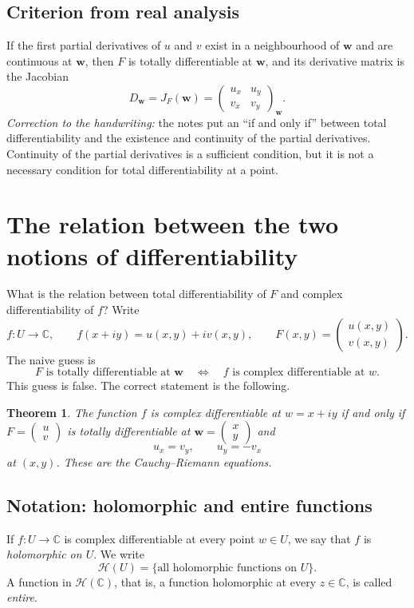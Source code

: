 \documentclass[11pt]{article}
\newcommand{\C}{\mathbb C}
\newcommand{\ww}{\mathbf w}
\newtheorem*{theorem}{Theorem}
\begin{document}
\subsection*{Criterion from real analysis}
If the first partial derivatives of $u$ and $v$ exist in a neighbourhood
of $\ww$ and are continuous at $\ww$, then $F$ is totally differentiable
at $\ww$, and its derivative matrix is the Jacobian
\[
 D_{\ww}=J_F(\ww)=
 \begin{pmatrix}u_x&u_y\\v_x&v_y\end{pmatrix}_{\ww}.
\]
\textit{Correction to the handwriting:} the notes put an
``if and only if'' between total differentiability and the existence and
continuity of the partial derivatives. Continuity of the partial derivatives
is a sufficient condition, but it is not a necessary condition for total
differentiability at a point.

\section{The relation between the two notions of differentiability}
What is the relation between total differentiability of $F$ and complex
differentiability of $f$? Write
\[
 f:U\to\C,\qquad f(x+iy)=u(x,y)+iv(x,y),\qquad
 F(x,y)=\begin{pmatrix}u(x,y)\\v(x,y)\end{pmatrix}.
\]
The naive guess is
\[
 F\text{ is totally differentiable at }\ww
 \quad\Longleftrightarrow\quad
 f\text{ is complex differentiable at }w.
\]
This guess is false. The correct statement is the following.
\begin{theorem}
The function $f$ is complex differentiable at $w=x+iy$ if and only if
$F=\begin{pmatrix}u\\v\end{pmatrix}$ is totally differentiable at
$\ww=\begin{pmatrix}x\\y\end{pmatrix}$ and
\[
 \boxed{u_x=v_y,\qquad u_y=-v_x}
\]
at $(x,y)$. These are the \emph{Cauchy--Riemann equations}.
\end{theorem}

\subsection*{Notation: holomorphic and entire functions}
If $f:U\to\C$ is complex differentiable at every point $w\in U$, we say
that $f$ is \emph{holomorphic on $U$}. We write
\[
 \mathcal H(U)=\{\text{all holomorphic functions on }U\}.
\]
A function in $\mathcal H(\C)$, that is, a function holomorphic at every
$z\in\C$, is called \emph{entire}.
\end{document}
